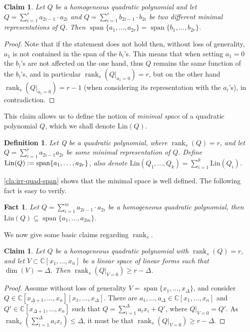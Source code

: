 \documentclass[10pt,a4paper]{article}
\newtheorem{definition}[theorem]{Definition}
\newtheorem{fact}[theorem]{Fact}
\newtheorem{claim}[theorem]{Claim}
\def\rank{\operatorname{rank}}
\newcommand{\eqdef}{\vcentcolon=}
\renewcommand{\C}{\mathbb{C}}
\newcommand{\MVar}[2]{{#1}_1,\ldots, {#1}_{#2}}
\newcommand{\PRing}[3]{\mathbb{#1}[ \MVar{#2}{#3}]}
\newcommand{\CRing}[2]{\PRing{C}{#1}{#2}}
\newcommand{\spn}[1]{\operatorname{span}\{{#1}\}}
\newcommand{\MS}{\text{Lin}}
\begin{document}
\begin{claim}\label{cla:irr-quad-span}
Let $Q$ be a homogeneous quadratic polynomial and let $Q=\sum_{i=1}^{r}a_{2i-1}\cdot a_{2i}$ and $Q = \sum_{i=1}^{r}b_{2i-1}\cdot b_{2i}$ be two different minimal representations of $Q$. Then $\spn{\MVar{a}{2r}} =\spn{\MVar{b}{2r}}$.
\end{claim}

\begin{proof}
Note that if the statement does not hold then,  without loss of generality, $a_1$ is not contained in the span of the $b_i$'s. This means that when setting $a_1=0$ the $b_i$'s are not affected on the one hand, thus $Q$ remains the same function of the $b_i$'s, and in particular $\rank_s(Q|_{a_1=0})=r$, but on the other hand $\rank_s(Q|_{a_1=0})=r-1$ (when considering its representation with the $a_i$'s), in contradiction.
\end{proof}

This claim allows us to define the notion of \textit{minimal space} of a quadratic polynomial $Q$, which we shall denote $\MS(Q)$.
\begin{definition}\label{def:MS}
Let Q be a quadratic polynomial, where $\rank_s(Q) = r$, and let $Q = \sum \limits_{i=1}^r a_{2i-1}a_{2i}$ be some minimal representation of $Q$.
Define $\MS(Q)\eqdef \spn{\MVar{a}{2r}}$, also denote $\MS(\MVar{Q}{k}) = \sum \limits_{i=1}^k \MS(Q_i)$.
\end{definition}
\autoref{cla:irr-quad-span} shows that the minimal space is well defined. The following fact is easy to verify.

\begin{fact}\label{cor:containMS}
Let $Q=\sum_{i=1}^{m}a_{2i-1}\cdot a_{2i}$ be a homogeneous quadratic polynomial, then $\MS(Q)\subseteq \spn{\MVar{a}{2m}}$.
\end{fact}

We now give some basic claims regarding $\rank_s$.









\begin{claim}\label{cla:rank-mod-space}
Let $Q$ be a homogeneous quadratic polynomial with $\rank_s(Q)=r$, and let $V \subset \CRing{x}{n}$ be a linear space of linear forms such that $\dim(V)=\Delta$. Then $\rank_s(Q|_{V=0})\geq r-\Delta$.
\end{claim}
\begin{proof}
Assume  without loss of generality $V = \spn{\MVar{x}{\Delta}}$, and consider $Q\in \C[x_{\Delta+1},\ldots,x_n][\MVar{x}{\Delta}]$. There are $\MVar{a}{\Delta} \in \CRing{x}{n}$ and $Q' \in \C[x_{\Delta+1},\ldots,x_n]$ such that $Q = \sum_{i=1}^{\Delta} a_ix_i + Q'$, where $Q|_{V=0} = Q'$. As $\rank_s(\sum_{i=1}^{\Delta} a_ix_i ) \leq \Delta$, it must be that $\rank_s(Q|_{V=0}) \geq r-\Delta$.
\end{proof}
\end{document}
